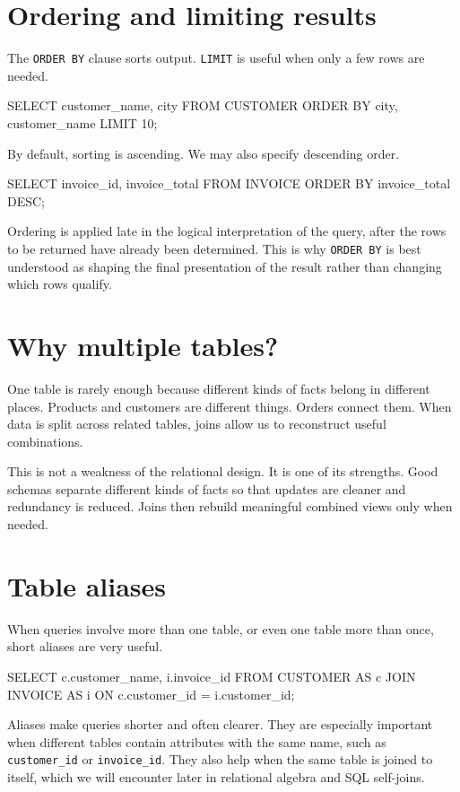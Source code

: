 \documentclass[11pt,a4paper,openany]{book}
\begin{document}
\section{Ordering and limiting results}
The \texttt{ORDER BY} clause sorts output. \texttt{LIMIT} is useful when only a few rows are needed.

\begin{codesql}
SELECT customer_name, city
FROM CUSTOMER
ORDER BY city, customer_name
LIMIT 10;
\end{codesql}

By default, sorting is ascending. We may also specify descending order.

\begin{codesql}
SELECT invoice_id, invoice_total
FROM INVOICE
ORDER BY invoice_total DESC;
\end{codesql}

Ordering is applied late in the logical interpretation of the query, after the rows to be returned have already been determined. This is why \texttt{ORDER BY} is best understood as shaping the final presentation of the result rather than changing which rows qualify.

\section{Why multiple tables?}
One table is rarely enough because different kinds of facts belong in different places. Products and customers are different things. Orders connect them. When data is split across related tables, joins allow us to reconstruct useful combinations.

This is not a weakness of the relational design. It is one of its strengths. Good schemas separate different kinds of facts so that updates are cleaner and redundancy is reduced. Joins then rebuild meaningful combined views only when needed.

\section{Table aliases}
When queries involve more than one table, or even one table more than once, short aliases are very useful.

\begin{codesql}
SELECT c.customer_name, i.invoice_id
FROM CUSTOMER AS c
JOIN INVOICE AS i
  ON c.customer_id = i.customer_id;
\end{codesql}

Aliases make queries shorter and often clearer. They are especially important when different tables contain attributes with the same name, such as \texttt{customer\_id} or \texttt{invoice\_id}. They also help when the same table is joined to itself, which we will encounter later in relational algebra and SQL self-joins.
\end{document}
